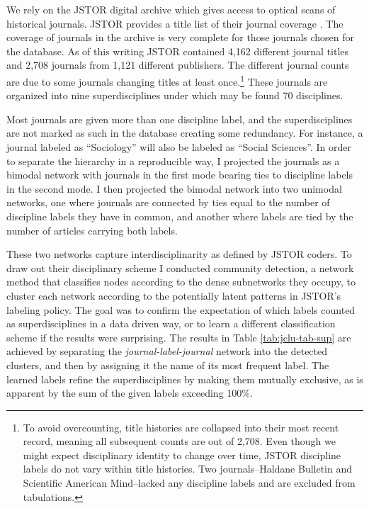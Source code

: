 \documentclass[]{book}
\let\rmarkdownfootnote\footnote%
\def\footnote{\protect\rmarkdownfootnote}
\begin{document}
We rely on the JSTOR digital archive which gives access to optical scans
of historical journals. JSTOR provides a title list of their journal
coverage \citep{2018JSTOR}. The coverage of journals in the archive is
very complete for those journals chosen for the database. As of this
writing JSTOR contained 4,162 different journal titles and 2,708
journals from 1,121 different publishers. The different journal counts
are due to some journals changing titles at least once.\footnote{To
  avoid overcounting, title histories are collapsed into their most
  recent record, meaning all subsequent counts are out of 2,708. Even
  though we might expect disciplinary identity to change over time,
  JSTOR discipline labels do not vary within title histories. Two
  journals--Haldane Bulletin and Scientific American Mind--lacked any
  discipline labels and are excluded from tabulations.} These journals
are organized into nine superdisciplines under which may be found 70
disciplines.

Most journals are given more than one discipline label, and the
superdisciplines are not marked as such in the database creating some
redundancy. For instance, a journal labeled as ``Sociology'' will also
be labeled as ``Social Sciences''. In order to separate the hierarchy in
a reproducible way, I projected the journals as a bimodal network with
journals in the first mode bearing ties to discipline labels in the
second mode. I then projected the bimodal network into two unimodal
networks, one where journals are connected by ties equal to the number
of discipline labels they have in common, and another where labels are
tied by the number of articles carrying both labels.

These two networks capture interdisciplinarity as defined by JSTOR
coders. To draw out their disciplinary scheme I conducted community
detection, a network method that classifies nodes according to the dense
subnetworks they occupy, to cluster each network according to the
potentially latent patterns in JSTOR's labeling policy. The goal was to
confirm the expectation of which labels counted as superdisciplines in a
data driven way, or to learn a different classification scheme if the
results were surprising. The results in Table \ref{tab:jclu-tab-sup} are
achieved by separating the \emph{journal-label-journal} network into the
detected clusters, and then by assigning it the name of its most
frequent label. The learned labels refine the superdisciplines by making
them mutually exclusive, as is apparent by the sum of the given labels
exceeding 100\%.
\end{document}
